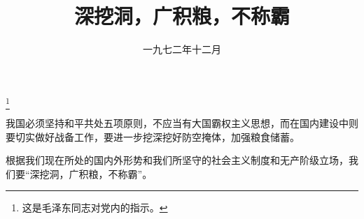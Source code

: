 
\title{深挖洞，广积粮，不称霸}
\date{一九七二年十二月}
\thanks{这是毛泽东同志对党内的指示。}
\maketitle


我国必须坚持和平共处五项原则，不应当有大国霸权主义思想，而在国内建设中则要切实做好战备工作，要进一步挖深挖好防空掩体，加强粮食储蓄。

根据我们现在所处的国内外形势和我们所坚守的社会主义制度和无产阶级立场，我们要“深挖洞，广积粮，不称霸”。
